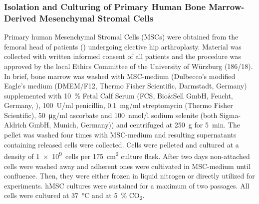 


\subsubsection*{Isolation and Culturing of Primary Human Bone Marrow-Derived Mesenchymal Stromal Cells}%
Primary human Mesenchymal Stromal Cells (MSCs) were obtained from the femoral
head of patients () undergoing elective hip
arthroplasty. Material was collected with written informed consent of all
patients and the procedure was approved by the local Ethics Committee of the
University of Würzburg (186/18). In brief, bone marrow was washed with
MSC-medium (Dulbecco's modified Eagle's medium (DMEM/F12, Thermo Fisher
Scientific, Darmstadt, Germany) supplemented with \SI{10}{\percent} Fetal Calf
Serum (FCS, Bio\&Sell GmbH, Feucht, Germany,
\citet{fernandez-rebolloHumanPlateletLysate2017}), \SI{100}{U/ml} penicillin,
\SI{0.1}{mg/ml} streptomycin (Thermo Fisher Scientific), \SI{50}{\micro\gram/ml}
ascorbate and \SI{100}{nmol/l} sodium selenite (both Sigma-Aldrich GmbH, Munich,
Germany)) and centrifuged at \SI{250}{g} for \SI{5}{\minute}. The pellet was
washed four times with MSC-medium and resulting supernatants containing released
cells were collected. Cells were pelleted and cultured at a density of
\SI{1e9}{cells} per \SI{175}{cm\squared} culture flask. After two days
non-attached cells were washed away and adherent ones were cultivated in
MSC-medium until confluence. Then, they were either frozen in liquid nitrogen or
directly utilized for experiments. hMSC cultures were sustained for a maximum of
two passages. All cells were cultured at \SI{37}{\degreeCelsius} and at
\SI{5}{\percent} CO\textsubscript{2}.


